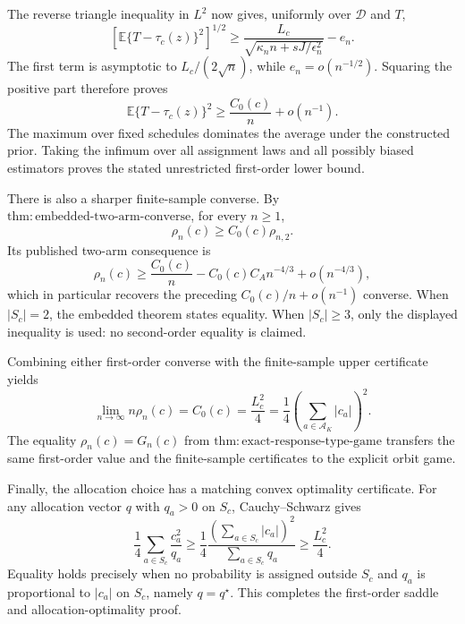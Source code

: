 The reverse triangle inequality in \(L^2\) now gives, uniformly over \(\mathcal D\) and \(T\),
\[
 \left[\mathbb E\{T-\tau_c(z)\}^2\right]^{1/2}
 \geq
 \frac{L_c}{\sqrt{\kappa_n n+sJ/\epsilon_n^2}}-e_n.
\]
The first term is asymptotic to \(L_c/(2\sqrt n)\), while \(e_n=o(n^{-1/2})\).  Squaring the positive part therefore proves
\[
 \mathbb E\{T-\tau_c(z)\}^2
 \geq\frac{C_0(c)}n+o(n^{-1}).
\]
The maximum over fixed schedules dominates the average under the constructed prior.  Taking the infimum over all assignment laws and all possibly biased estimators proves the stated unrestricted first-order lower bound.

There is also a sharper finite-sample converse.  By \(\mathrm{thm:embedded\text{-}two\text{-}arm\text{-}converse}\), for every \(n\geq1\),
\[
 \rho_n(c)\geq C_0(c)\rho_{n,2}.
\]
Its published two-arm consequence is
\[
 \rho_n(c)
 \geq\frac{C_0(c)}n-C_0(c)C_A n^{-4/3}+o(n^{-4/3}),
\]
which in particular recovers the preceding \(C_0(c)/n+o(n^{-1})\) converse.  When \(|S_c|=2\), the embedded theorem states equality.  When \(|S_c|\geq3\), only the displayed inequality is used: no second-order equality is claimed.

Combining either first-order converse with the finite-sample upper certificate yields
\[
 \lim_{n\to\infty}n\rho_n(c)
 =C_0(c)=\frac{L_c^2}{4}
 =\frac14\left(\sum_{a\in\mathcal A_K}|c_a|\right)^2.
\]
The equality \(\rho_n(c)=G_n(c)\) from \(\mathrm{thm:exact\text{-}response\text{-}type\text{-}game}\) transfers the same first-order value and the finite-sample certificates to the explicit orbit game.

Finally, the allocation choice has a matching convex optimality certificate.  For any allocation vector \(q\) with \(q_a>0\) on \(S_c\), Cauchy--Schwarz gives
\[
 \frac14\sum_{a\in S_c}\frac{c_a^2}{q_a}
 \geq\frac14
 \frac{\left(\sum_{a\in S_c}|c_a|\right)^2}
 {\sum_{a\in S_c}q_a}
 \geq\frac{L_c^2}{4}.
\]
Equality holds precisely when no probability is assigned outside \(S_c\) and \(q_a\) is proportional to \(|c_a|\) on \(S_c\), namely \(q=q^\star\).  This completes the first-order saddle and allocation-optimality proof.